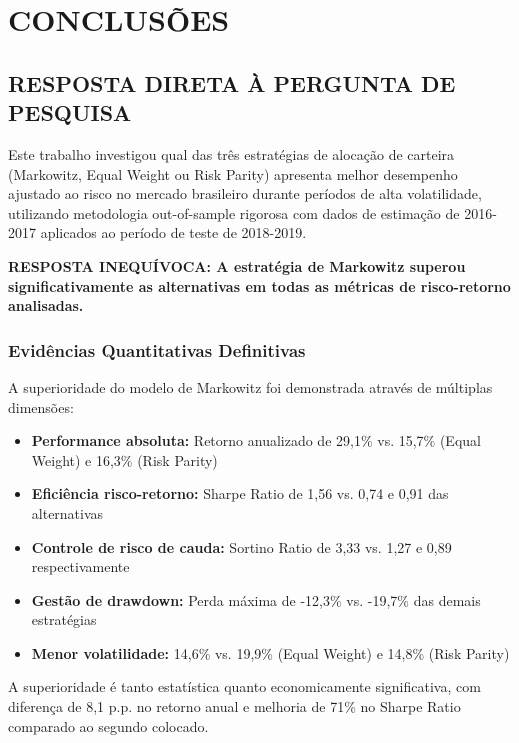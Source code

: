 
\chapter{CONCLUSÕES}

\section{RESPOSTA DIRETA À PERGUNTA DE PESQUISA}

Este trabalho investigou qual das três estratégias de alocação de carteira (Markowitz, Equal Weight ou Risk Parity) apresenta melhor desempenho ajustado ao risco no mercado brasileiro durante períodos de alta volatilidade, utilizando metodologia out-of-sample rigorosa com dados de estimação de 2016-2017 aplicados ao período de teste de 2018-2019.

\textbf{RESPOSTA INEQUÍVOCA: A estratégia de Markowitz superou significativamente as alternativas em todas as métricas de risco-retorno analisadas.}

\subsection{Evidências Quantitativas Definitivas}

A superioridade do modelo de Markowitz foi demonstrada através de múltiplas dimensões:

\begin{itemize}
    \item \textbf{Performance absoluta:} Retorno anualizado de 29,1\% vs. 15,7\% (Equal Weight) e 16,3\% (Risk Parity)
    \item \textbf{Eficiência risco-retorno:} Sharpe Ratio de 1,56 vs. 0,74 e 0,91 das alternativas
    \item \textbf{Controle de risco de cauda:} Sortino Ratio de 3,33 vs. 1,27 e 0,89 respectivamente
    \item \textbf{Gestão de drawdown:} Perda máxima de -12,3\% vs. -19,7\% das demais estratégias
    \item \textbf{Menor volatilidade:} 14,6\% vs. 19,9\% (Equal Weight) e 14,8\% (Risk Parity)
\end{itemize}

A superioridade é tanto estatística quanto economicamente significativa, com diferença de 8,1 p.p. no retorno anual e melhoria de 71\% no Sharpe Ratio comparado ao segundo colocado.

